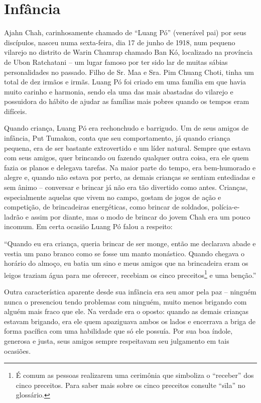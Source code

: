 \thistitleoffsettrue
\chapter{Infância}

Ajahn Chah, carinhosamente chamado de ``Luang Pó'' (venerável pai) por
seus discípulos, nasceu numa sexta-feira, dia 17 de junho de 1918, num
pequeno vilarejo no distrito de Warin Chamrap chamado Ban Kó, localizado
na província de Ubon Ratchatani -- um lugar famoso por ter sido lar de
muitas sábias personalidades no passado. Filho de Sr. Maa e Sra. Pim
Chuang Choti, tinha um total de dez irmãos e irmãs. Luang Pó foi criado
em uma família em que havia muito carinho e harmonia, sendo ela uma das
mais abastadas do vilarejo e possuidora do hábito de ajudar as famílias
mais pobres quando os tempos eram difíceis.

Quando criança, Luang Pó era rechonchudo e barrigudo. Um de seus amigos
de infância, Put Tumakon, conta que seu comportamento, já quando criança
pequena, era de ser bastante extrovertido e um líder natural. Sempre que
estava com seus amigos, quer brincando ou fazendo qualquer outra coisa,
era ele quem fazia os planos e delegava tarefas. Na maior parte do
tempo, era bem-humorado e alegre e, quando não estava por perto, as
demais crianças se sentiam entediadas e sem ânimo -- conversar e brincar
já não era tão divertido como antes. Crianças, especialmente aquelas que
vivem no campo, gostam de jogos de ação e competição, de brincadeiras
energéticas, como brincar de soldados, polícia-e-ladrão e assim por
diante, mas o modo de brincar do jovem Chah era um pouco incomum. Em
certa ocasião Luang Pó falou a respeito:

``Quando eu era criança, queria brincar de ser monge, então me declarava
abade e vestia um pano branco como se fosse um manto monástico. Quando
chegava o horário do almoço, eu batia um sino e meus amigos que na
brincadeira eram os leigos traziam água para me oferecer, recebiam os
cinco preceitos\footnote{É comum as pessoas realizarem uma cerimônia que
  simboliza o ``receber'' dos cinco preceitos. Para saber mais sobre os
  cinco preceitos consulte ``sīla'' no glossário.} e uma benção.''

Outra característica aparente desde sua infância era seu amor pela paz
-- ninguém nunca o presenciou tendo problemas com ninguém, muito menos
brigando com alguém mais fraco que ele. Na verdade era o oposto: quando
as demais crianças estavam brigando, era ele quem apaziguava ambos os
lados e encerrava a briga de forma pacífica com uma habilidade que só
ele possuía. Por sua boa índole, generosa e justa, seus amigos sempre
respeitavam seu julgamento em tais ocasiões.

